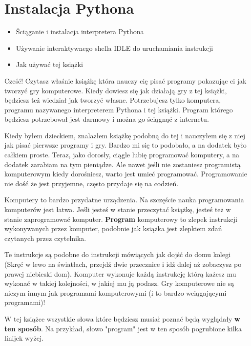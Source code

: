 \documentclass{book}
\newcommand{\btopicscovered}{
	\begin{graybox}
	\begin{itemize}
}
\newcommand{\etopicscovered}{
	\end{itemize}
	\end{graybox}
}
\begin{document}
\chapter{Instalacja Pythona}
\btopicscovered
	\item Ściąganie i instalacja interpretera Pythona
	\item Używanie interaktywnego shella IDLE do uruchamiania instrukcji
	\item Jak używać tej książki
\etopicscovered



Cześć! Czytasz właśnie książkę która nauczy cię pisać programy pokazując ci jak tworzyć gry komputerowe. Kiedy dowiesz się jak działają gry z tej książki, będziesz też wiedział jak tworzyć własne. Potrzebujesz tylko komputera, programu nazywanego interpreterem Pythona i tej książki. Program którego będziesz potrzebował jest darmowy i można go ściągnąć z internetu.

Kiedy byłem dzieckiem, znalazłem książkę podobną do tej i nauczyłem się z niej jak pisać pierwsze programy i gry. Bardzo mi się to podobało, a na dodatek było całkiem proste. Teraz, jako dorosły, ciągle lubię programować komputery, a na dodatek zarabiam na tym pieniądze. Ale nawet jeśli nie zostaniesz programistą komputerowym kiedy dorośniesz, warto jest umieć programować. Programowanie nie dość że jest przyjemne, często przydaje się na codzień.

Komputery to bardzo przydatne urządzenia. Na szczęście nauka programowania komputerów jest łatwa. Jeśli jesteś w stanie przeczytać książkę, jesteś też w stanie zaprogramować komputer. {\bf Program} komputerowy to zlepek instrukcji wykonywanych przez komputer, podobnie jak książka jest zlepkiem zdań czytanych przez czytelnika.

Te instrukcje są podobne do instrukcji mówiących jak dojść do domu kolegi (Skręć w lewo na światłach, przejdź dwie przecznice i idź dalej aż zobaczysz po prawej niebieski dom). Komputer wykonuje każdą instrukcję którą każesz mu wykonać w takiej kolejności, w jakiej mu ją podasz. Gry komputerowe nie są niczym innym jak programami komputerowymi (i to bardzo wciągającymi programami)!

W tej książce wszystkie słowa które będziesz musiał poznać będą wyglądały {\bf w ten sposób}. Na przykład, słowo "program" jest w ten sposób pogrubione kilka linijek wyżej.
\end{document}
